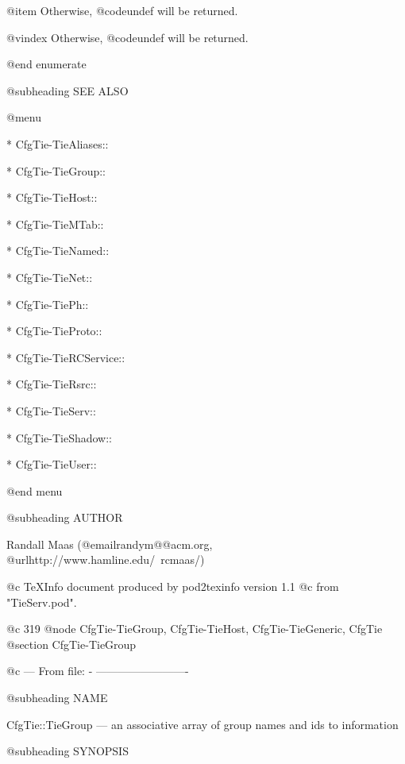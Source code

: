 @item
Otherwise, @code{undef} will be returned.

@vindex Otherwise, @code{undef} will be returned.

@end enumerate

@subheading SEE ALSO


@menu

* CfgTie-TieAliases::	
 
* CfgTie-TieGroup::	
 
* CfgTie-TieHost::	


* CfgTie-TieMTab::	
    
* CfgTie-TieNamed::	
 
* CfgTie-TieNet::	


* CfgTie-TiePh::	
      
* CfgTie-TieProto::	
 
* CfgTie-TieRCService::	


* CfgTie-TieRsrc::	
    
* CfgTie-TieServ::	
  
* CfgTie-TieShadow::	


* CfgTie-TieUser::	


@end menu

@subheading AUTHOR

Randall Maas (@email{randym@@acm.org}, @url{http://www.hamline.edu/~rcmaas/})

@c TeXInfo document produced by pod2texinfo version 1.1
@c from "TieServ.pod".


@c 319
@node CfgTie-TieGroup, CfgTie-TieHost, CfgTie-TieGeneric, CfgTie
@section CfgTie-TieGroup


@c --- From file: - -------------------------

@subheading NAME


CfgTie::TieGroup --- an associative array of group names and ids to information

@subheading SYNOPSIS

